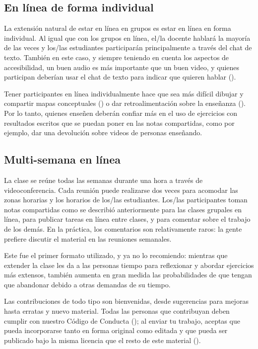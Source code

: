 \subsection*{En línea de forma individual}

La extensión natural de estar en línea en grupos es estar en línea en forma individual.
Al igual que con los grupos en línea,
el/la docente hablará la mayoría de las veces y los/las estudiantes participarán principalmente a través del chat de texto.
También en este caso, y siempre teniendo en cuenta los aspectos de accesibilidad, un buen audio es más importante que un buen video,
y quienes participan deberían usar el chat de texto para indicar que quieren hablar ().

Tener participantes en línea individualmente hace que sea más difícil dibujar y compartir mapas conceptuales ()
o dar retroalimentación sobre la enseñanza ().
Por lo tanto, quienes enseñen deberán confiar más en el uso de ejercicios con resultados escritos que se puedan poner en las notas compartidas,
como por ejemplo, dar una devolución sobre videos de personas enseñando.

\subsection*{Multi-semana en línea}

La clase se reúne todas las semanas durante una hora a través de videoconferencia.
Cada reunión puede realizarse dos veces para acomodar las zonas horarias y los horarios de los/las estudiantes.
Los/las participantes toman notas compartidas como se describió anteriormente para las clases grupales en línea,
para publicar tareas en línea entre clases,
y para comentar sobre el trabajo de los demás.
En la práctica,
los comentarios son relativamente raros:
la gente prefiere discutir el material en las reuniones semanales.

Este fue el primer formato utilizado,
y ya no lo recomiendo:
mientras que extender la clase les da a las personas tiempo para reflexionar y abordar ejercicios más extensos,
también aumenta en gran medida las probabilidades de que tengan que abandonar debido a otras demandas de su tiempo.


Las contribuciones de todo tipo son bienvenidas,
desde sugerencias para mejoras hasta erratas y nuevo material.
Todas las personas que contribuyan deben cumplir con nuestro Código de Conducta ();
al enviar tu trabajo,
aceptas que pueda incorporarse tanto en forma original como editada
y que pueda ser publicado bajo la misma licencia que el resto de este material ().

